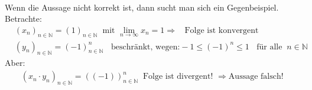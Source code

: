 \\
Wenn die Aussage nicht korrekt ist, dann sucht man sich ein Gegenbeispiel.\\
Betrachte:\\
\begin{align*}
&(x_n)_{n\in\mathbb{N}}=(1)_{n\in\mathbb{N}}\;\;\text{mit } \lim\limits_ {n\to\infty}x_n=1 \Rightarrow\;\;\text{ Folge ist konvergent}\\
&(y_n)_{n\in\mathbb{N}}=(-1)^n_{n\in\mathbb{N}}\;\;\text{ beschränkt, wegen:}-1\leq(-1)^n\leq 1\;\;\text{ für alle}\;\;n\in\mathbb{N}
\end{align*}
Aber:\\
\begin{align*}
(x_n\cdot y_n)_{n\in\mathbb{N}}=((-1))^n_{n\in\mathbb{N}}\;\;\text{Folge ist divergent! }\Rightarrow \text{Aussage falsch! }
\end{align*}
